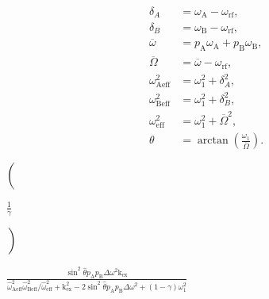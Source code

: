 \documentclass[a4paper,11pt,twoside,openright]{book}
\def\lthtmlcheckvsize{\ifdim\ht\sizebox<\vsize 
  \ifdim\wd\sizebox<\hsize\expandafter\hfill\fi \expandafter\vfill
  \else\expandafter\vss\fi}%
\begin{document}
{\newpage\clearpage
\setcounter{equation}{76}
%
\begin{subequations}\begin{align}
\delta_A &= \omega_{\textrm{A}}- \omega_{\textrm{rf}},\\
\delta_B &= \omega_{\textrm{B}}- \omega_{\textrm{rf}},\\
\overline{\omega}&= p_{\textrm{A}}\omega_{\textrm{A}}+ p_{\textrm{B}}\omega_{\textrm{B}}, \\
\overline{\Omega}&= \overline{\omega}- \omega_{\textrm{rf}}, \\
\omega_{\textrm{Aeff}}^2 &= \omega_1 ^2 + \delta_A^2, \\
\omega_{\textrm{Beff}}^2 &= \omega_1 ^2 + \delta_B^2, \\
\omega_{\textrm{eff}}^2 &= \omega_1 ^2 + \overline{\Omega}^2, \\
\theta &= \arctan \left( \frac{\omega_1 }{\overline{\Omega}} \right).
\end{align}\end{subequations}%
\lthtmldisplayZ
\lthtmlcheckvsize\clearpage}

{\newpage\clearpage
{}%
$\displaystyle \left(\vphantom{ \frac{1}{\gamma} }\right.$%
\lthtmlindisplaymathZ
\lthtmlcheckvsize\clearpage}

{\newpage\clearpage
{}%
$\displaystyle {\frac{{1}}{{\gamma}}}$%
\lthtmlindisplaymathZ
\lthtmlcheckvsize\clearpage}

{\newpage\clearpage
{}%
$\displaystyle \left.\vphantom{ \frac{1}{\gamma} }\right)$%
\lthtmlindisplaymathZ
\lthtmlcheckvsize\clearpage}

{\newpage\clearpage
{}%
$\displaystyle {\frac{{\sin^2\hat\theta p_{\textrm{A}}p_{\textrm{B}}\Delta\omega ^2\textrm{k}_{\textrm{ex}}}}{{\hat\omega_{\textrm{Aeff}}^2\hat\omega_{\textrm{Beff}}^2/\hat\omega_{\textrm{eff}}^2 + \textrm{k}_{\textrm{ex}}^2 - 2\sin^2\hat\theta p_{\textrm{A}}p_{\textrm{B}}\Delta\omega ^2 + (1 - \gamma)\omega_1 ^2}}}$%
\lthtmlindisplaymathZ
\lthtmlcheckvsize\clearpage}
\end{document}
